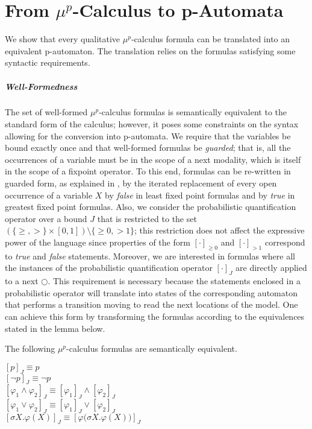 \documentclass[a4paper,UKenglish]{oasics-v2016}
\begin{document}
\section{From $\mu^p$-Calculus to p-Automata}
We show that every qualitative $\mu^p$-calculus formula can be translated into 
an equivalent p-automaton.
The translation relies on the formulas satisfying some syntactic requirements.  
\subparagraph{Well-Formedness}
The set of well-formed $\mu^p$-calculus formulas is semantically equivalent to 
the standard form of the calculus; however, it poses some constraints on the 
syntax allowing for the conversion into p-automata.
We require that the variables be bound exactly once and that well-formed 
formulas be \emph{guarded}; that is, all the occurrences of a variable must be 
in the scope of a next modality, which is itself in the scope of a fixpoint 
operator.
To this end, formulas can be re-written in guarded form, as explained in 
\cite{KVW00,BW15}, by the iterated replacement of every open occurrence of a 
variable $X$ by \emph{false} in least fixed point formulas and by \emph{true} 
in greatest fixed point formulas.
Also, we consider the probabilistic quantification operator over a bound $J$ 
that is restricted to the set $(\lbrace \geq, > \rbrace\times [0,1])\setminus 
\lbrace \geq 0, >1 \rbrace $; this restriction does not affect the expressive 
power of the language since properties of the form $[\cdot]_{\geq 0}$ and 
$[\cdot]_{>1}$ correspond to \emph{true} and \emph{false} statements.
Moreover, we are interested in formulas where all the instances of the 
probabilistic quantification operator $[\cdot]_J$ are directly applied to a 
next $\bigcirc$.
This requirement is necessary because the statements enclosed in a 
probabilistic operator will translate into states of the corresponding 
automaton that performs a transition moving to read the next locations of the 
model.
One can achieve this form by transforming the formulas according to the 
equivalences stated in the lemma below.
\begin{lemma}The following $\mu^{p}$-calculus formulas are semantically 
	equivalent.
\begin{center}
		$\left[p\right]_J \equiv p$\\
	$\left[\neg p\right]_J \equiv \neg p $\\
	$\left[\varphi_1 \wedge \varphi_2\right]_J \equiv \left[\varphi_1\right]_J 
	\wedge \left[\varphi_2\right]_J$\\
	$\left[\varphi_1 \vee \varphi_2\right]_J \equiv \left[\varphi_1\right]_J 
	\vee 
	\left[\varphi_2\right]_J $\\
	$\left[\sigma X.\varphi(X)\right]_J \equiv \left[\varphi \big(\sigma 
	X.\varphi(X) 
	\big)\right]_J$
\end{center}
\end{lemma}
\end{document}
